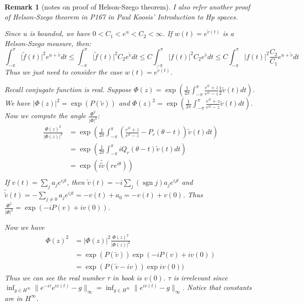 \documentclass{report}
\newtheorem{remark}{Remark}
\numberwithin{theorem}{subsection}
\numberwithin{remark}{subsection}
\newcommand{\norm}[1]{\lVert#1\rVert}
\newcommand{\abs}[1]{\left\lvert#1\right\rvert}
\newcommand{\absl}[1]{\lvert#1\rvert}
\newcommand{\sgn}{\operatorname{sgn}}
\begin{document}
\begin{remark}[notes on proof of Helson-Szego theorem]
    I also refer another proof of Helson-Szego theorem in P167 in Paul Koosis' \emph{Introduction to Hp spaces}.\par
    Since $u$ is bounded, we have $0<C_1<e^u<C_2<\infty$. If $w(t)=e^{\tilde{v}(t)}$ is a Helson-Szego measure, then:
    \begin{equation*}
        \int_{-\pi}^{\pi}\absl{\tilde{f}(t)}^2e^{u+\tilde{v}}d t\leq \int_{-\pi}^{\pi}\absl{\tilde{f}(t)}^2C_2e^{\tilde{v}}d t\leq C\int_{-\pi}^{\pi}\absl{{f}(t)}^2C_2e^{\tilde{v}}d t\leq C\int_{-\pi}^{\pi}\absl{{f}(t)}^2\frac{C_2}{C_1}e^{u+\tilde{v}}d t
    \end{equation*}
    Thus we just need to consider the case $w(t)=e^{\tilde{v}(t)}$.\par
    Recall conjugate function is real. Suppose $\Phi(z)=\exp{(\frac{1}{2\pi}\int_{-\pi}^{\pi}\frac{e^{it}+z}{e^{it}-z}\frac{1}{2}\tilde{v}(t)dt)}$.
    We have  $\abs{\Phi(z)}^2=\exp{(P(\tilde{v}))}$ and $\Phi(z)^2=\exp{(\frac{1}{2\pi}\int_{-\pi}^{\pi}\frac{e^{it}+z}{e^{it}-z}\tilde{v}(t)dt)}$. Now we compute the angle $\frac{\Phi^2}{\abs{\Phi}^2}$:
    \begin{align*}
        \frac{\Phi(z)^2}{\abs{\Phi(z)}^2} & =\exp{(\frac{1}{2\pi}\int_{-\pi}^{\pi}(\frac{e^{it}+z}{e^{it}-z}-P_r(\theta-t))\tilde{v}(t)d t)} \\
                                          & =\exp{(\frac{1}{2\pi}\int_{-\pi}^{\pi}iQ_r(\theta-t)\tilde{v}(t)d t)}                            \\
                                          & =\exp{(i\tilde{\tilde{v}}(re^{i\theta}))}                                                        \\
    \end{align*}
    If $v(t)=\sum_{j}{a_je^{ijt}}$, then $\tilde{v}(t)=-i\sum_{j}{(\sgn j)a_je^{ijt}}$ and $\tilde{\tilde{v}}(t)=-\sum_{j\neq 0}{a_je^{ijt}}=-v(t)+a_0=-v(t)+v(0)$. Thus $\frac{\Phi^2}{\abs{\Phi}^2}=\exp{(-iP(v)+iv(0))}$.\par
    Now we have
    \begin{align*}
        \Phi(z)^2 & =\abs{\Phi(z)}^2\frac{\Phi(z)^2}{\abs{\Phi(z)}^2} \\
                  & =\exp{(P(\tilde{v}))}\exp{(-iP(v)+iv(0))}         \\
                  & =\exp{(P(\tilde{v}-iv))}\exp{iv(0))}
    \end{align*}
    Thus we can see the real number $\tau$ in book is $v(0)$. $\tau$ is irrelevant since $\inf_{g\in H^\infty}{\norm{e^{-i\tau}e^{iv(t)}-g}_\infty}=\inf_{g\in H^\infty}{\norm{e^{iv(t)}-g}_\infty}$. Notice that constants are in $H^\infty$.

\end{remark}
\end{document}
